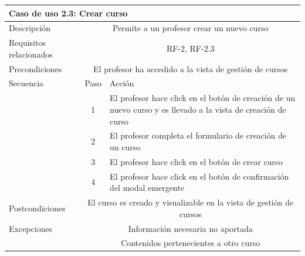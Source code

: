 \begin{tabular}[H]{l c l}
\toprule 
\multicolumn{3}{l}{\textbf{Caso de uso 2.3: Crear curso}}\\
\midrule
Descripción & \multicolumn{2}{p{10cm}}{Permite a un profesor crear un nuevo curso}\\
\midrule
Requisitos relacionados & \multicolumn{2}{p{10cm}}{RF-2, RF-2.3}\\
\midrule
Precondiciones & \multicolumn{2}{p{10cm}}{El profesor ha accedido a la vista de gestión de cursos}\\
\midrule
Secuencia & Paso & Acción \\
\cmidrule{2-3}
         & 1 &  \multicolumn{1}{p{8cm}}{El profesor hace click en el botón de creación de un nuevo curso y es llevado a la vista de creación de curso}\\
         & 2 &  \multicolumn{1}{p{8cm}}{El profesor completa el formulario de creación de un curso}\\
         & 3 &  \multicolumn{1}{p{8cm}}{El profesor hace click en el botón de crear curso}\\
         & 4 &  \multicolumn{1}{p{8cm}}{El profesor hace click en el botón de confirmación del modal emergente}\\

\midrule
Postcondiciones & \multicolumn{2}{p{10cm}}{El curso es creado y visualizable en la vista de gestión de cursos}\\
\midrule
Excepciones & \multicolumn{2}{p{10cm}}{Información necesaria no aportada}\\
            & \multicolumn{2}{p{10cm}}{Contenidos pertenecientes a otro curso}\\
\bottomrule 
\end{tabular}

\hspace{3cm}

